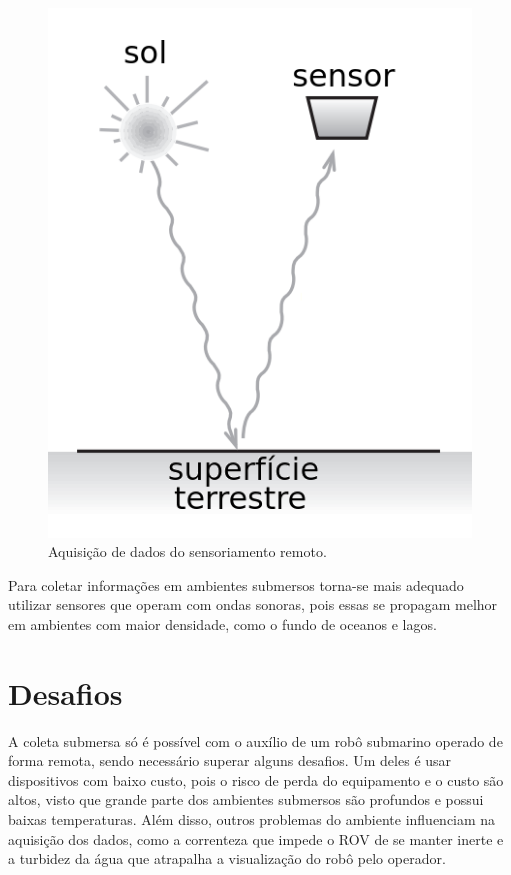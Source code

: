 \begin{figure}[H]
    \centering
    \includegraphics[scale=0.5]{dados/figuras/remote_sensor.png}
    \caption{Aquisição de dados do sensoriamento remoto.}
    \vspace{-0.8em}
    \label{fig:remote_sensor}
\end{figure}

Para coletar informações em ambientes submersos torna-se mais adequado utilizar sensores que operam com ondas sonoras, pois essas se propagam melhor em ambientes com maior densidade, como o fundo de oceanos e lagos.

\section{Desafios}
\label{sec:desafios}

A coleta submersa só é possível com o auxílio de um robô submarino operado de forma remota, sendo necessário superar alguns desafios.
Um deles é usar dispositivos com baixo custo, pois o risco de perda do equipamento e o custo são altos, visto que grande parte dos ambientes submersos são profundos e possui baixas temperaturas.
Além disso, outros problemas do ambiente influenciam na aquisição dos dados, como a correnteza que impede o ROV de se manter inerte e a turbidez da água que atrapalha a visualização do robô pelo operador.

